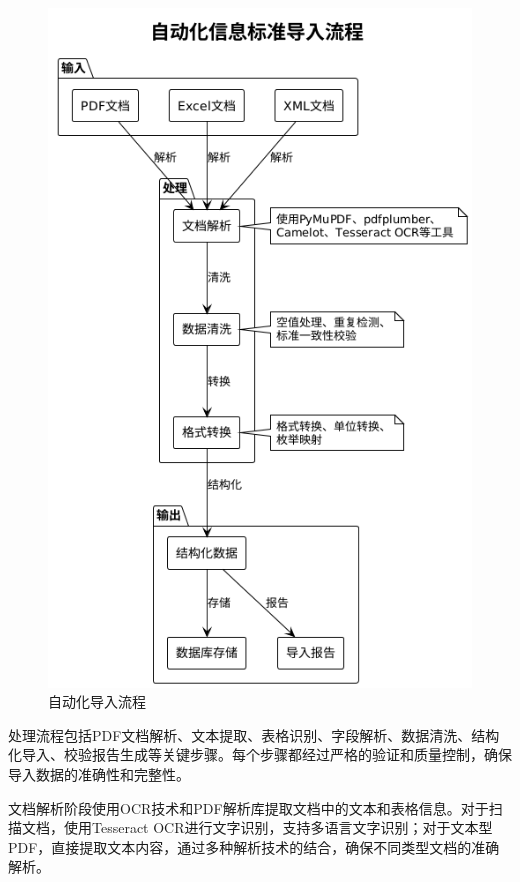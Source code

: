 \begin{figure}[H]
    \centering
    \includegraphics[height=0.5\textheight,keepaspectratio]{chapters/fig-0/import_pipeline_simple.png}
    \caption{自动化导入流程}
    \label{fig:import_pipeline}
\end{figure}

处理流程包括PDF文档解析、文本提取、表格识别、字段解析、数据清洗、结构化导入、校验报告生成等关键步骤。每个步骤都经过严格的验证和质量控制，确保导入数据的准确性和完整性。

文档解析阶段使用OCR技术和PDF解析库提取文档中的文本和表格信息。对于扫描文档，使用Tesseract OCR进行文字识别，支持多语言文字识别；对于文本型PDF，直接提取文本内容，通过多种解析技术的结合，确保不同类型文档的准确解析。

